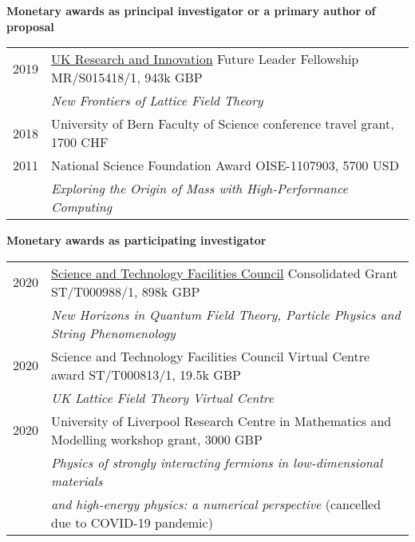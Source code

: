 \renewenvironment{spacelist} {
  \begin{list} {} {
    \setlength{\topsep}{-8 pt}
    \setlength{\itemsep}{5 pt}
    \setlength{\leftmargin}{-1.15 in}
  }
}{
  \end{list}
}

\raggedright
\vspace{12 pt}
\begin{spacelist}
  \item {\large \bfseries Monetary awards as principal investigator or a primary author of proposal} \\[10 pt]
    \begin{tabular}[t]{cl}
      2019 & \href{https://www.ukri.org}{UK Research and Innovation} Future Leader Fellowship {MR/S015418/1}, 943k GBP \\
           & \textit{New Frontiers of Lattice Field Theory}                                                            \\[6 pt]
      2018 & University of Bern Faculty of Science conference travel grant, 1700 CHF                                   \\[6 pt]
      2011 & National Science Foundation Award OISE-1107903, 5700 USD                                                  \\
           & \textit{Exploring the Origin of Mass with High-Performance Computing}                                     \\
    \end{tabular}

  \spacer
  \item {\large \bfseries Monetary awards as participating investigator} \\[10 pt]
    \begin{tabular}[t]{cl}
      2020 & \href{https://stfc.ukri.org}{Science and Technology Facilities Council} Consolidated Grant {ST/T000988/1}, 898k GBP \\
           & \textit{New Horizons in Quantum Field Theory, Particle Physics and String Phenomenology}                            \\[6 pt]
      2020 & Science and Technology Facilities Council Virtual Centre award {ST/T000813/1}, 19.5k GBP                            \\
           & \textit{UK Lattice Field Theory Virtual Centre}                                                                     \\[6 pt]
      2020 & University of Liverpool Research Centre in Mathematics and Modelling workshop grant, 3000 GBP                       \\
           & \textit{Physics of strongly interacting fermions in low-dimensional materials}                                      \\
           & \hspace{2.4 cm} \textit{and high-energy physics: a numerical perspective} (cancelled due to COVID-19 pandemic)      \\
    \end{tabular}


\end{spacelist}
